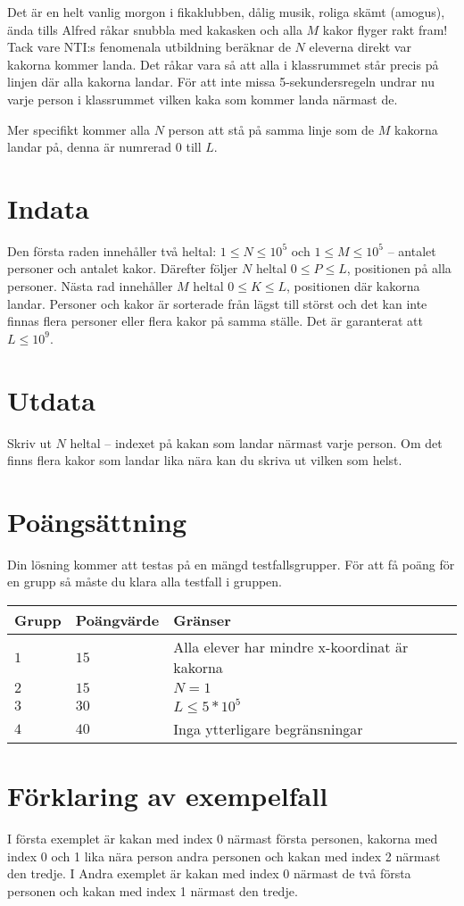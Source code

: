 Det är en helt vanlig morgon i fikaklubben, dålig musik, roliga skämt (amogus), ända tills Alfred råkar snubbla med kakasken och alla $M$ kakor flyger rakt fram!
Tack vare NTI:s fenomenala utbildning beräknar de $N$ eleverna direkt var kakorna kommer landa. Det råkar vara så att alla i klassrummet står precis på linjen där alla kakorna landar.
För att inte missa 5-sekundersregeln undrar nu varje person i klassrummet vilken kaka som kommer landa närmast de. 

Mer specifikt kommer alla $N$ person att stå på samma linje som de $M$ kakorna landar på, denna är numrerad 0 till $L$.


\section*{Indata}
Den första raden innehåller två heltal: $1\leq N \leq 10^5$ och $1 \leq M \leq 10^5$ -- antalet personer och antalet kakor. 
Därefter följer $N$ heltal $0 \leq P \leq L$, positionen på alla personer.
Nästa rad innehåller $M$ heltal $0 \leq K \leq L$, positionen där kakorna landar.
Personer och kakor är sorterade från lägst till störst och det kan inte finnas flera personer eller flera kakor på samma ställe.
Det är garanterat att $L \leq 10^9$.

\section*{Utdata}
Skriv ut $N$ heltal -- indexet på kakan som landar närmast varje person. Om det finns flera kakor som landar lika nära kan du skriva ut vilken som helst.

\section*{Poängsättning}
Din lösning kommer att testas på en mängd testfallsgrupper.
För att få poäng för en grupp så måste du klara alla testfall i gruppen.

\noindent
\begin{tabular}{| l | l | p{12cm} |}
  \hline
  Grupp & Poängvärde & Gränser \\ \hline
  $1$   & $15$       & Alla elever har mindre x-koordinat är kakorna \\ \hline
  $2$   & $15$       & $N=1$ \\ \hline
  $3$   & $30$       & $L \leq 5*10^5$ \\ \hline
  $4$   & $40$       & Inga ytterligare begränsningar  \\ \hline
\end{tabular}

\section*{Förklaring av exempelfall}
I första exemplet är kakan med index 0 närmast första personen, kakorna med index 0 och 1 lika nära person andra personen och kakan med index 2 närmast den tredje.
I Andra exemplet är kakan med index 0 närmast de två första personen och kakan med index 1 närmast den tredje.